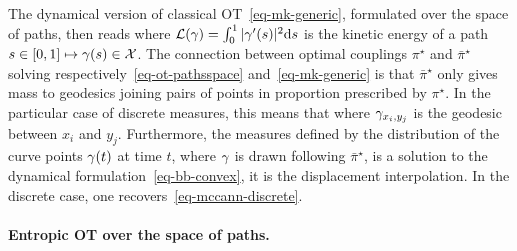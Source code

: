 The dynamical version of classical OT~\eqref{eq-mk-generic}, formulated over the space of paths, then reads
where $\mathcal{L}(\gamma) = \int_0^1 |\gamma'(s)|^2 \mathrm{d} s$ is the kinetic energy of a path $s \in [0,1] \mapsto \gamma(s) \in \mathcal{X}$. The connection between optimal couplings $\pi^\star$ and $\bar\pi^\star$ solving respectively~\eqref{eq-ot-pathsspace} and~\eqref{eq-mk-generic} is that $\bar\pi^\star$ only gives mass to geodesics joining pairs of points in proportion prescribed by $\pi^\star$. In the particular case of discrete measures, this means that 
where $\gamma_{x_i,y_j}$ is the geodesic between $x_i$ and $y_j$. Furthermore, the measures defined by the distribution of the curve points $\gamma(t)$ at time $t$, where $\gamma$ is drawn following $\bar\pi^\star$, \ie
{}
is a solution to the dynamical formulation~\eqref{eq-bb-convex}, \ie it is the displacement interpolation. 
%
In the discrete case, one recovers~\eqref{eq-mccann-discrete}. 

\paragraph{Entropic OT over the space of paths.}

